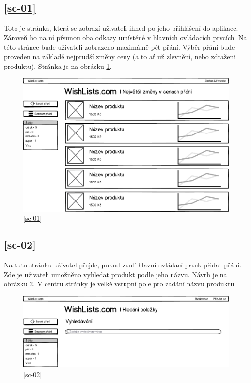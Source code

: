 \subsection{\ref{sc-01}}
Toto je stránka, která se zobrazí uživateli ihned po jeho přihlášení do aplikace. Zároveň ho na ní přsunou oba odkazy umístěné v hlavních ovládacích prvcích. Na této stránce bude uživateli zobrazeno maximálně pět přání. Výběr přání bude proveden na základě nejprudší změny ceny (a to ať už zlevnění, nebo zdražení produktu). Stránka je na obrázku \ref{fig:uvodni-prihlaseny-uzivatel}.

\begin{figure}[htb]
\begin{center}
\includegraphics[width=130mm]{./pictures/mock/uvodni-prihlaseny-uzivatel.png}
\caption{\ref{sc-01}}
\label{fig:uvodni-prihlaseny-uzivatel}
\end{center}
\end{figure}

\subsection{\ref{sc-02}}
Na tuto stránku uživatel přejde, pokud zvolí hlavní ovládací prvek přidat přání. Zde je uživateli umožněno vyhledat produkt podle jeho názvu. Návrh je na obrázku \ref{fig:vyhledavani}. V centru stránky je velké vstupní pole pro zadání názvu produktu.

\begin{figure}[htb]
\begin{center}
\includegraphics[width=130mm]{./pictures/mock/vyhledavani.png}
\caption{\ref{sc-02}}
\label{fig:vyhledavani}
\end{center}
\end{figure}

